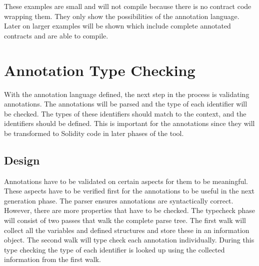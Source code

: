 \documentclass[a4paper]{article}
\begin{document}
These examples are small and will not compile because there is no contract code wrapping them. They only show the possibilities of the annotation language. Later on larger examples will be shown which include complete annotated contracts and are able to compile.

\newpage
\section{Annotation Type Checking}
\label{sec:typechecker}
With the annotation language defined, the next step in the process is validating annotations. The annotations will be parsed and the type of each identifier will be checked. The types of these identifiers should match to the context, and the identifiers should be defined. This is important for the annotations since they will be transformed to Solidity code in later phases of the tool.

\subsection{Design}
Annotations have to be validated on certain aspects for them to be meaningful. These aspects have to be verified first for the annotations to be useful in the next generation phase. The parser ensures annotations are syntactically correct. However, there are more properties that have to be checked. The typecheck phase will consist of two passes that walk the complete parse tree. The first walk will collect all the variables and defined structures and store these in an information object. The second walk will type check each annotation individually. During this type checking the type of each identifier is looked up using the collected information from the first walk. 
\end{document}
